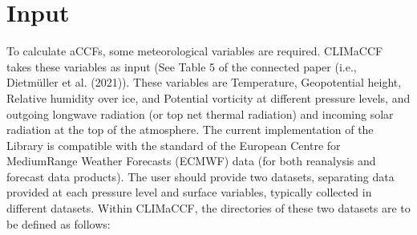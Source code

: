 \documentclass[a4paper,11pt,english]{sphinxmanual}
\begin{document}
\section{Input}
\label{\detokenize{gStarted:input}}
To calculate aCCFs, some meteorological variables are required. CLIMaCCF takes these variables as input (See Table 5 of the connected paper (i.e., Dietmüller et al. (2021)).
These variables are Temperature, Geopotential height, Relative humidity over ice, and Potential vorticity at different pressure levels,
and outgoing longwave radiation (or top net thermal radiation) and incoming solar radiation at the top of the atmosphere.
The current implementation of the Library is compatible with the standard of the European Centre for Medium\sphinxhyphen{}Range Weather Forecasts (ECMWF) data (for both reanalysis and forecast data products).
The user should provide two datasets, separating data provided at each pressure level and surface variables, typically collected in different datasets. Within CLIMaCCF, the directories of these two datasets are to be defined as follows:

\begin{sphinxVerbatim}[commandchars=\\\{\}]
  
\PYG{p}{[}\PYG{p}{]}     
\PYG{p}{[}\PYG{p}{]}     
\end{sphinxVerbatim}
\end{document}
